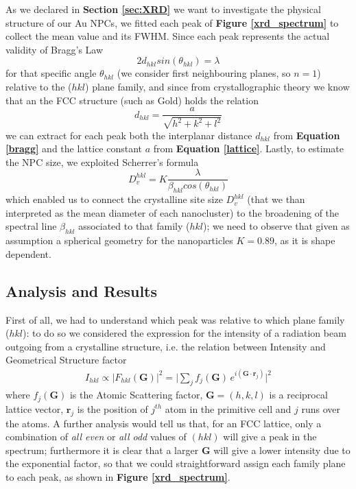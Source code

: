 \documentclass[twocolumn]{article}
\begin{document}
\begin{multicols}{2}
As we declared in {\bf Section \ref{sec:XRD}} we want to investigate the physical structure of our Au NPCs, we fitted each peak of {\bf Figure \ref{xrd_spectrum}} to collect the mean value and its FWHM. Since each peak represents the actual validity of Bragg's Law 
\begin{equation}
    2d_{hkl}sin(\theta_{hkl})=\lambda
\label{bragg}
\end{equation}
for that specific angle $\theta_{hkl}$ (we consider first neighbouring planes, so $n=1$) relative to the ($hkl$) plane family, and since from crystallographic theory we know that an the FCC structure (such as Gold) holds the relation
\begin{equation}
    d_{hkl} = \frac{a}{\sqrt{h^2 + k^2 + l^2}}
\label{lattice}
\end{equation}
we can extract for each peak both the interplanar distance $d_{hkl}$ from {\bf Equation \ref{bragg}} and the lattice constant $a$ from {\bf Equation \ref{lattice}}. Lastly, to estimate the NPC size, we exploited Scherrer's formula 
\begin{equation}
    D_v^{hkl} = K\frac{\lambda}{\beta_{hkl} cos(\theta_{hkl})}
\label{scherrer}
\end{equation}
which enabled us to connect the crystalline site size $D_v^{hkl}$ (that we than interpreted as the mean diameter of each nanocluster) to the broadening of the spectral line $\beta_{hkl}$ associated to that family ($hkl$); we need to observe that given as assumption a spherical geometry for the nanoparticles $K=0.89$, as it is shape dependent. 


\subsection{Analysis and Results}
First of all, we had to understand which peak was relative to which plane family ($hkl$): to do so we considered the expression for the intensity of a radiation beam outgoing from a crystalline structure, i.e. the relation between Intensity and Geometrical Structure factor
\begin{equation}
\begin{aligned}
    I_{hkl} \propto |F_{hkl}(\mathbf{G})|^2 = \bigg|\sum_j f_j(\mathbf{G})\,e^{i(\mathbf{G}\cdot \mathbf{r}_j)}\bigg|^2
\end{aligned}
\label{struct_fact}
\end{equation}
where $f_j(\mathbf{G})$ is the Atomic Scattering factor, $\mathbf{G} = (h,k,l)$ is a reciprocal lattice vector, $\mathbf{r}_j$ is the position of $j^{th}$ atom in the primitive cell and $j$ runs over the atoms. A further analysis would tell us that, for an FCC lattice, only a combination of {\it all even} or {\it all odd} values of $(hkl)$ will give a peak in the spectrum; furthermore it is clear that a larger $\mathbf{G}$ will give a lower intensity due to the exponential factor, so that we could straightforward assign each family plane to each peak, as shown in {\bf Figure \ref{xrd_spectrum}}.


\end{multicols}
\end{document}
